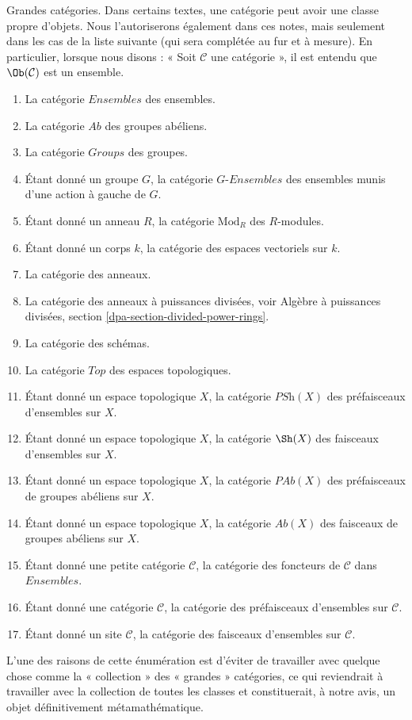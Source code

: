 \begin{remark}
\label{remark-big-categories}
Grandes catégories. Dans certains textes, une catégorie peut avoir une classe
propre d'objets. Nous l'autoriserons également dans ces notes, mais seulement
dans les cas de la liste suivante (qui sera complétée au fur et à mesure).
En particulier, lorsque nous disons : « Soit $\mathcal{C}$ une catégorie »,
il est entendu que $\Ob(\mathcal{C})$ est un ensemble.
\begin{enumerate}
\item La catégorie $\textit{Ensembles}$ des ensembles.
\item La catégorie $\textit{Ab}$ des groupes abéliens.
\item La catégorie $\textit{Groups}$ des groupes.
\item Étant donné un groupe $G$, la catégorie $G\textit{-Ensembles}$ des
ensembles munis d'une action à gauche de $G$.
\item Étant donné un anneau $R$, la catégorie $\text{Mod}_R$ des $R$-modules.
\item Étant donné un corps $k$, la catégorie des espaces vectoriels sur $k$.
\item La catégorie des anneaux.
\item La catégorie des anneaux à puissances divisées, voir
Algèbre à puissances divisées, section \ref{dpa-section-divided-power-rings}.
\item La catégorie des schémas.
\item La catégorie $\textit{Top}$ des espaces topologiques.
\item Étant donné un espace topologique $X$, la catégorie
$\textit{PSh}(X)$ des préfaisceaux d'ensembles sur $X$.
\item Étant donné un espace topologique $X$, la catégorie
$\Sh(X)$ des faisceaux d'ensembles sur $X$.
\item Étant donné un espace topologique $X$, la catégorie
$\textit{PAb}(X)$ des préfaisceaux de groupes abéliens sur $X$.
\item Étant donné un espace topologique $X$, la catégorie
$\textit{Ab}(X)$ des faisceaux de groupes abéliens sur $X$.
\item Étant donné une petite catégorie $\mathcal{C}$, la catégorie des foncteurs
de $\mathcal{C}$ dans $\textit{Ensembles}$.
\item Étant donné une catégorie $\mathcal{C}$, la catégorie des préfaisceaux
d'ensembles sur $\mathcal{C}$.
\item Étant donné un site $\mathcal{C}$, la catégorie des faisceaux
d'ensembles sur $\mathcal{C}$.
\end{enumerate}
L'une des raisons de cette énumération est d'éviter de travailler
avec quelque chose comme la « collection » des « grandes » catégories,
ce qui reviendrait à travailler avec la collection de toutes les classes
et constituerait, à notre avis, un objet définitivement métamathématique.
\end{remark}

